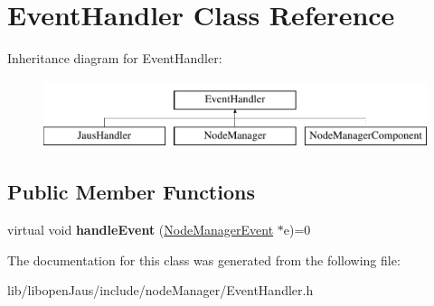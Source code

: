 \hypertarget{class_event_handler}{\section{\-Event\-Handler \-Class \-Reference}
\label{class_event_handler}
}
\-Inheritance diagram for \-Event\-Handler\-:\begin{figure}[H]
\begin{center}
\leavevmode
\includegraphics[height=2.000000cm]{class_event_handler}
\end{center}
\end{figure}
\subsection*{\-Public \-Member \-Functions}
\begin{DoxyCompactItemize}
\item 
\hypertarget{class_event_handler_a198cabd08a4ee62ba6371d01547033e6}{virtual void {\bfseries handle\-Event} (\hyperlink{class_node_manager_event}{\-Node\-Manager\-Event} $\ast$e)=0}\label{class_event_handler_a198cabd08a4ee62ba6371d01547033e6}

\end{DoxyCompactItemize}


\-The documentation for this class was generated from the following file\-:\begin{DoxyCompactItemize}
\item 
lib/libopen\-Jaus/include/node\-Manager/\-Event\-Handler.\-h\end{DoxyCompactItemize}
